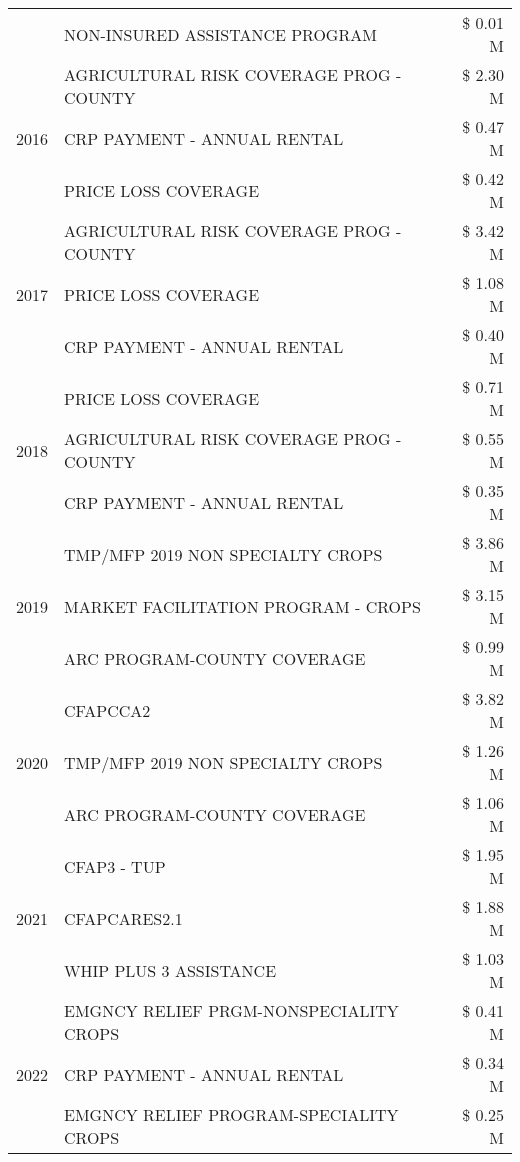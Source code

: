 \begin{tabular}{llr}
 & NON-INSURED ASSISTANCE PROGRAM & \$ 0.01 M \\
\cline{1-3}
\multirow[t]{3}{*}{2016} & AGRICULTURAL RISK COVERAGE PROG - COUNTY & \$ 2.30 M \\
 & CRP PAYMENT - ANNUAL RENTAL & \$ 0.47 M \\
 & PRICE LOSS COVERAGE & \$ 0.42 M \\
\cline{1-3}
\multirow[t]{3}{*}{2017} & AGRICULTURAL RISK COVERAGE PROG - COUNTY & \$ 3.42 M \\
 & PRICE LOSS COVERAGE & \$ 1.08 M \\
 & CRP PAYMENT - ANNUAL RENTAL & \$ 0.40 M \\
\cline{1-3}
\multirow[t]{3}{*}{2018} & PRICE LOSS COVERAGE & \$ 0.71 M \\
 & AGRICULTURAL RISK COVERAGE PROG - COUNTY & \$ 0.55 M \\
 & CRP PAYMENT - ANNUAL RENTAL & \$ 0.35 M \\
\cline{1-3}
\multirow[t]{3}{*}{2019} & TMP/MFP 2019 NON SPECIALTY CROPS & \$ 3.86 M \\
 & MARKET FACILITATION PROGRAM - CROPS & \$ 3.15 M \\
 & ARC PROGRAM-COUNTY COVERAGE & \$ 0.99 M \\
\cline{1-3}
\multirow[t]{3}{*}{2020} & CFAPCCA2 & \$ 3.82 M \\
 & TMP/MFP 2019 NON SPECIALTY CROPS & \$ 1.26 M \\
 & ARC PROGRAM-COUNTY COVERAGE & \$ 1.06 M \\
\cline{1-3}
\multirow[t]{3}{*}{2021} & CFAP3 - TUP & \$ 1.95 M \\
 & CFAPCARES2.1 & \$ 1.88 M \\
 & WHIP PLUS 3 ASSISTANCE & \$ 1.03 M \\
\cline{1-3}
\multirow[t]{3}{*}{2022} & EMGNCY RELIEF PRGM-NONSPECIALITY CROPS & \$ 0.41 M \\
 & CRP PAYMENT - ANNUAL RENTAL & \$ 0.34 M \\
 & EMGNCY RELIEF PROGRAM-SPECIALITY CROPS & \$ 0.25 M \\
\cline{1-3}
\bottomrule
\end{tabular}
